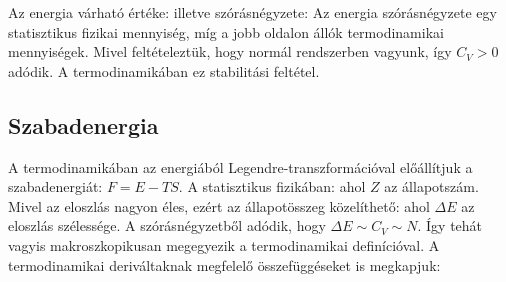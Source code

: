    Az energia várható értéke:
   illetve szórásnégyzete:
   Az energia szórásnégyzete egy statisztikus fizikai mennyiség, míg a jobb oldalon állók termodinamikai mennyiségek.
   Mivel feltételeztük, hogy normál rendszerben vagyunk, így $C_V>0$ adódik.
   A termodinamikában ez stabilitási feltétel.
   
  \subsection{Szabadenergia}
   
   A termodinamikában az energiából Legendre-transzformációval előállítjuk a szabadenergiát: $F=E-TS$.
   A statisztikus fizikában:
   ahol $Z$ az állapotszám.
   Mivel az eloszlás nagyon éles, ezért az állapotösszeg közelíthető:
   ahol $\Delta E$ az eloszlás szélessége.
   A szórásnégyzetből adódik, hogy $\Delta E\sim C_V\sim N$. Így tehát
   vagyis makroszkopikusan megegyezik a termodinamikai definícióval.
   A termodinamikai deriváltaknak megfelelő összefüggéseket is megkapjuk:
   

